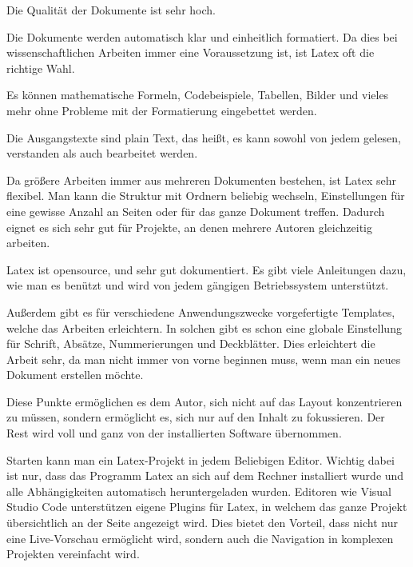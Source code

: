 \begin{compactitem}
    \item Die Qualität der Dokumente ist sehr hoch. 
    \item Die Dokumente werden automatisch klar und einheitlich formatiert. Da dies bei wissenschaftlichen Arbeiten immer eine Voraussetzung ist, ist Latex oft die richtige Wahl. 
    \item Es können mathematische Formeln, Codebeispiele, Tabellen, Bilder und vieles mehr ohne Probleme mit der Formatierung eingebettet werden. 
    \item Die Ausgangstexte sind plain Text, das heißt, es kann sowohl von jedem gelesen, verstanden als auch bearbeitet werden. 
    \item Da größere Arbeiten immer aus mehreren Dokumenten bestehen, ist Latex sehr flexibel. Man kann die Struktur mit Ordnern beliebig wechseln, Einstellungen für eine gewisse Anzahl an Seiten oder für das ganze Dokument treffen. Dadurch eignet es sich sehr gut für Projekte, an denen mehrere Autoren gleichzeitig arbeiten.  
    \item Latex ist opensource, und sehr gut dokumentiert.  Es gibt viele Anleitungen dazu, wie man es benützt und wird von jedem gängigen Betriebssystem unterstützt. 
    \item Außerdem gibt es für verschiedene Anwendungszwecke vorgefertigte Templates, welche das Arbeiten erleichtern. In solchen gibt es schon eine globale Einstellung für Schrift, Absätze, Nummerierungen und Deckblätter. Dies erleichtert die Arbeit sehr, da man nicht immer von vorne beginnen muss, wenn man ein neues Dokument erstellen möchte.  
\end{compactitem}

Diese Punkte ermöglichen es dem Autor, sich nicht auf das Layout konzentrieren zu müssen, sondern ermöglicht es, sich nur auf den Inhalt zu fokussieren.  Der Rest wird voll und ganz von der installierten Software übernommen. 

 

Starten kann man ein Latex-Projekt in jedem Beliebigen Editor.  Wichtig dabei ist nur, dass das Programm Latex an sich auf dem Rechner installiert wurde und alle Abhängigkeiten automatisch heruntergeladen wurden. Editoren wie Visual Studio Code unterstützen eigene Plugins für Latex, in welchem das ganze Projekt übersichtlich an der Seite angezeigt wird. Dies bietet den Vorteil, dass nicht nur eine Live-Vorschau ermöglicht wird, sondern auch die Navigation in komplexen Projekten vereinfacht wird.  

